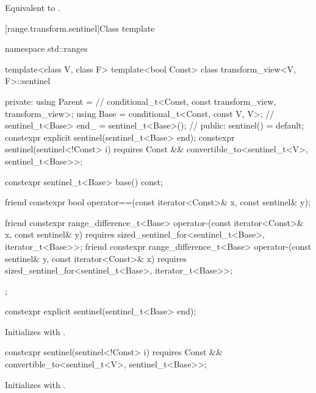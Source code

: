 \begin{itemdescr}
\pnum
\effects
Equivalent to .
\end{itemdescr}


[range.transform.sentinel]{Class template }

%
\begin{codeblock}
namespace std::ranges {
  template<class V, class F>
  template<bool Const>
  class transform_view<V, F>::sentinel {
  private:
    using Parent =                                      // \expos
      conditional_t<Const, const transform_view, transform_view>;
    using Base = conditional_t<Const, const V, V>;      // \expos
    sentinel_t<Base> end_ = sentinel_t<Base>();         // \expos
  public:
    sentinel() = default;
    constexpr explicit sentinel(sentinel_t<Base> end);
    constexpr sentinel(sentinel<!Const> i)
      requires Const && convertible_to<sentinel_t<V>, sentinel_t<Base>>;

    constexpr sentinel_t<Base> base() const;

    friend constexpr bool operator==(const iterator<Const>& x, const sentinel& y);

    friend constexpr range_difference_t<Base>
      operator-(const iterator<Const>& x, const sentinel& y)
        requires sized_sentinel_for<sentinel_t<Base>, iterator_t<Base>>;
    friend constexpr range_difference_t<Base>
      operator-(const sentinel& y, const iterator<Const>& x)
        requires sized_sentinel_for<sentinel_t<Base>, iterator_t<Base>>;
  };
}
\end{codeblock}

%
\begin{itemdecl}
constexpr explicit sentinel(sentinel_t<Base> end);
\end{itemdecl}

\begin{itemdescr}
\pnum
\effects
Initializes  with .
\end{itemdescr}

%
\begin{itemdecl}
constexpr sentinel(sentinel<!Const> i)
  requires Const && convertible_to<sentinel_t<V>, sentinel_t<Base>>;
\end{itemdecl}

\begin{itemdescr}
\pnum
\effects
Initializes  with .
\end{itemdescr}

